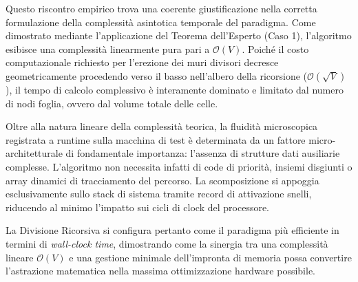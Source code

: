 \documentclass[12pt, a4paper]{article}
\begin{document}
	Questo riscontro empirico trova una coerente giustificazione nella corretta formulazione della complessità asintotica temporale del paradigma. Come dimostrato mediante l'applicazione del Teorema dell'Esperto (Caso 1), l'algoritmo esibisce una complessità linearmente pura pari a $\mathcal{O}(V)$. Poiché il costo computazionale richiesto per l'erezione dei muri divisori decresce geometricamente procedendo verso il basso nell'albero della ricorsione ($\mathcal{O}(\sqrt{V})$), il tempo di calcolo complessivo è interamente dominato e limitato dal numero di nodi foglia, ovvero dal volume totale delle celle.
	
	Oltre alla natura lineare della complessità teorica, la fluidità microscopica registrata a runtime sulla macchina di test è determinata da un fattore micro-architetturale di fondamentale importanza: l'assenza di strutture dati ausiliarie complesse. L'algoritmo non necessita infatti di code di priorità, insiemi disgiunti o array dinamici di tracciamento del percorso. La scomposizione si appoggia esclusivamente sullo stack di sistema tramite record di attivazione snelli, riducendo al minimo l'impatto sui cicli di clock del processore.
	
	La Divisione Ricorsiva si configura pertanto come il paradigma più efficiente in termini di \textit{wall-clock time}, dimostrando come la sinergia tra una complessità lineare $\mathcal{O}(V)$ e una gestione minimale dell'impronta di memoria possa convertire l'astrazione matematica nella massima ottimizzazione hardware possibile.
	
\end{document}
